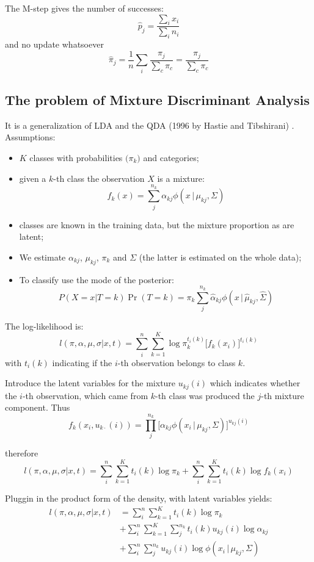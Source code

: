 \documentclass[a4paper]{article}
\begin{document}
The M-step gives the number of successes:
\[\hat{p}_j = \frac{\sum_i x_i }{\sum_i n_i}\]
and no update whatsoever
\[\hat{\pi}_j = \frac{1}{n}\sum_i \frac{\pi_j}{\sum_c \pi_c} = \frac{\pi_j}{\sum_c \pi_c}\]



\subsection{The problem of Mixture Discriminant Analysis} %
\label{sub:the_problem_of_mixture_discriminant_analysis}

It is a generalization of LDA and the QDA (1996 by Hastie and Tibshirani) . 
Assumptions: \begin{itemize}
	\item $K$ classes with probabilities $\big(\pi_k\big)$ and categories;
	\item given a $k$-th class the observation $X$ is a mixture:
	\[f_k(x) = \sum_j^{n_k}\alpha_{kj} \phi(x\,\lvert\,\mu_{kj}, \Sigma)\]
	\item classes are known in the training data, but the mixture proportion as are latent;
	\item We estimate $\alpha_{kj}$, $\mu_{kj}$, $\pi_k$ and $\Sigma$ (the latter is estimated on the whole data);
	\item To classify use the mode of the posterior:
	\[P(X=x\lvert T=k) \Pr(T=k) = \pi_k \sum_j^{n_k} \hat{\alpha}_{kj} \phi(x\,\lvert\,\hat{\mu}_{kj}, \hat{\Sigma})\]
\end{itemize}

The log-likelihood is:
\[l(\pi, \alpha, \mu, \sigma\lvert x, t) = \sum_i^n \sum_{k=1}^K \log \pi_k^{t_i(k)} \big[f_k(x_i)\big]^{t_i(k)}\]
with $t_i(k)$ indicating if the $i$-th observation belongs to class $k$.

Introduce the latent variables for the mixture $u_{kj}(i)$ which indicates whether the $i$-th observation, which
came from $k$-th class was produced the $j$-th mixture component. Thus
\[f_k(x_i, u_{k\cdot}(i)) = \prod_j^{n_k} \big[ \alpha_{kj} \phi(x_i\,\lvert\,\mu_{kj}, \Sigma)\big]^{u_{kj}(i)}\]

therefore
\[l(\pi, \alpha, \mu, \sigma\lvert x, t)
= \sum_i^n \sum_{k=1}^K t_i(k) \log \pi_k + \sum_i^n \sum_{k=1}^K t_i(k) \log f_k(x_i)\]

Pluggin in the product form of the density, with latent variables yields:
\begin{align*}
l(\pi, \alpha, \mu, \sigma\lvert x, t)
&= \sum_i^n \sum_{k=1}^K t_i(k) \log \pi_k\\
&+ \sum_i^n \sum_{k=1}^K \sum_j^{n_k} t_i(k) u_{kj}(i) \log \alpha_{kj}\\
&+ \sum_i^n \sum_j^{n_k} u_{kj}(i) \log \phi(x_i\,\lvert\,\mu_{kj}, \Sigma)
\end{align*}
\end{document}
